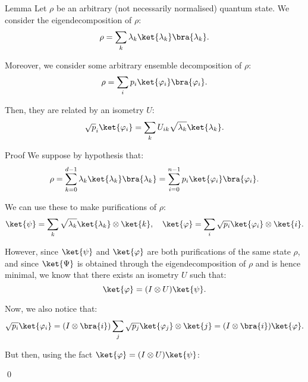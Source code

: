 \documentclass[a4paper]{article}
\begin{document}
\begin{parag}{Lemma}
    Let $\rho$ be an arbitrary (not necessarily normalised) quantum state. We consider the eigendecomposition of $\rho$:
    \[\rho = \sum_{k} \lambda_k \ket{\lambda_k}\bra{\lambda_k}.\]

    Moreover, we consider some arbitrary ensemble decomposition of $\rho$: 
    \[\rho = \sum_{i} p_i \ket{\phi_i}\bra{\phi_i}.\]

    Then, they are related by an isometry $U$: 
    \[\sqrt{p}_i \ket{\phi_i} = \sum_{k} U_{ik} \sqrt{\lambda_k} \ket{\lambda_k}.\]

    \begin{subparag}{Proof}
        We suppose by hypothesis that: 
        \[\rho = \sum_{k=0}^{d-1} \lambda_k \ket{\lambda_k}\bra{\lambda_k} = \sum_{i=0}^{n-1} p_i \ket{\phi_i}\bra{\phi_i}.\]

        We can use these to make purifications of $\rho$:
        \[\ket{\psi} = \sum_{k} \sqrt{\lambda_k} \ket{\lambda_k} \otimes \ket{k}, \mathspace \ket{\phi} = \sum_{i} \sqrt{p_i} \ket{\phi_i} \otimes \ket{i}.\]
        
        However, since $\ket{\psi}$ and $\ket{\phi}$ are both purifications of the same state $\rho$, and since $\ket{\Psi}$ is obtained through the eigendecomposition of $\rho$ and is hence minimal, we know that there exists an isometry $U$ such that: 
        \[\ket{\phi} = \left(I \otimes U\right) \ket{\psi}.\]

        Now, we also notice that: 
        \[\sqrt{p_i} \ket{\phi_i} = \left(I \otimes \bra{i}\right) \sum_{j} \sqrt{p_j} \ket{\phi_j} \otimes \ket{j} = \left(I \otimes \bra{i}\right) \ket{\phi}.\]

        But then, using the fact $\ket{\phi} = \left(I \otimes U\right) \ket{\psi}$:

        \qed
    \end{subparag}
\end{parag}
\end{document}

